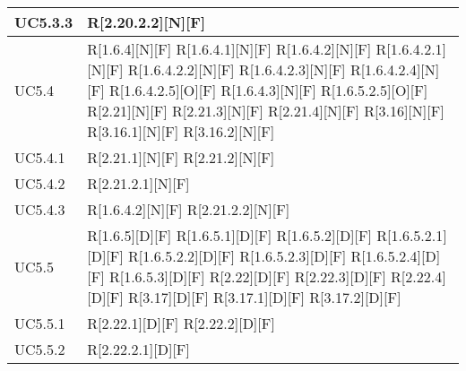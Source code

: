 \begin{longtable}{X | X}
\hline
UC5.3.3 & R[2.20.2.2][N][F]  \\
\hline
UC5.4 & R[1.6.4][N][F] \newline
R[1.6.4.1][N][F] \newline
R[1.6.4.2][N][F] \newline
R[1.6.4.2.1][N][F] \newline
R[1.6.4.2.2][N][F] \newline
R[1.6.4.2.3][N][F] \newline
R[1.6.4.2.4][N][F] \newline
R[1.6.4.2.5][O][F] \newline
R[1.6.4.3][N][F] \newline
R[1.6.5.2.5][O][F] \newline
R[2.21][N][F] \newline
R[2.21.3][N][F] \newline
R[2.21.4][N][F] \newline
R[3.16][N][F] \newline
R[3.16.1][N][F] \newline
R[3.16.2][N][F]  \\
\hline
UC5.4.1 & R[2.21.1][N][F] \newline
R[2.21.2][N][F]  \\
\hline
UC5.4.2 & R[2.21.2.1][N][F]  \\
\hline
UC5.4.3 & R[1.6.4.2][N][F] \newline
R[2.21.2.2][N][F]  \\
\hline
UC5.5 & R[1.6.5][D][F] \newline
R[1.6.5.1][D][F] \newline
R[1.6.5.2][D][F] \newline
R[1.6.5.2.1][D][F] \newline
R[1.6.5.2.2][D][F] \newline
R[1.6.5.2.3][D][F] \newline
R[1.6.5.2.4][D][F] \newline
R[1.6.5.3][D][F] \newline
R[2.22][D][F] \newline
R[2.22.3][D][F] \newline
R[2.22.4][D][F] \newline
R[3.17][D][F] \newline
R[3.17.1][D][F] \newline
R[3.17.2][D][F]  \\
\hline
UC5.5.1 & R[2.22.1][D][F] \newline
R[2.22.2][D][F]  \\
\hline
UC5.5.2 & R[2.22.2.1][D][F]  \\

\end{longtable}
